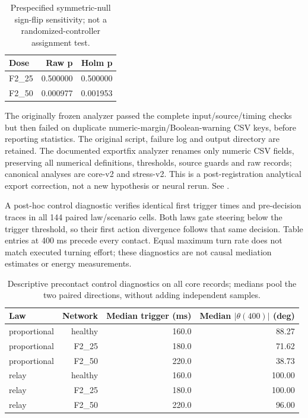 \documentclass[10pt,letterpaper]{article}
\begin{document}
\begin{table}[H]
\centering\small
\caption{Prespecified symmetric-null sign-flip sensitivity; not a randomized-controller assignment test.}
\begin{tabular}{lrr}
\toprule
Dose & Raw p & Holm p\\
\midrule
F2\_25 & 0.500000 & 0.500000\\
F2\_50 & 0.000977 & 0.001953\\
\bottomrule
\end{tabular}
\end{table}

The originally frozen analyzer passed the complete input/source/timing checks but then failed on duplicate numeric-margin/Boolean-warning CSV keys, before reporting statistics. The original script, failure log and output directory are retained. The documented exportfix analyzer renames only numeric CSV fields, preserving all numerical definitions, thresholds, source guards and raw records; canonical analyses are core-v2 and stress-v2. This is a post-registration analytical export correction, not a new hypothesis or neural rerun. See .

A post-hoc control diagnostic verifies identical first trigger times and pre-decision traces in all 144 paired law/scenario cells. Both laws gate steering below the trigger threshold, so their first action divergence follows that same decision. Table entries at 400 ms precede every contact. Equal maximum turn rate does not match executed turning effort; these diagnostics are not causal mediation estimates or energy measurements.

\begin{table}[H]
\centering\small
\caption{Descriptive precontact control diagnostics on all core records; medians pool the two paired directions, without adding independent samples.}
\begin{tabular}{lrrr}
\toprule
Law & Network & Median trigger (ms) & Median $|\theta(400)|$ (deg)\\
\midrule
proportional & healthy & 160.0 & 88.27\\
proportional & F2\_25 & 180.0 & 71.62\\
proportional & F2\_50 & 220.0 & 38.73\\
relay & healthy & 160.0 & 100.00\\
relay & F2\_25 & 180.0 & 100.00\\
relay & F2\_50 & 220.0 & 96.00\\
\bottomrule
\end{tabular}
\end{table}
\end{document}
